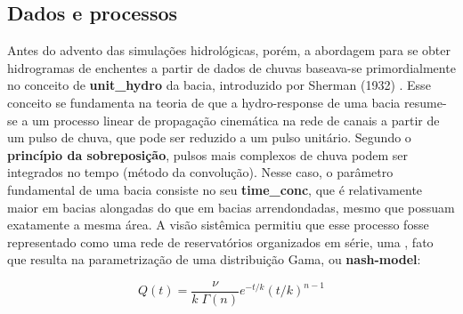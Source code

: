 \documentclass[./main.tex]{subfiles}
\begin{document}
\subsection{Dados e processos} \label{sec:hydro:databased}

\par Antes do advento das simulações hidrológicas, porém, a abordagem para se obter hidrogramas de enchentes a partir de dados de chuvas baseava-se primordialmente no conceito de \textbf{\gls{unit_hydro}} da bacia, introduzido por Sherman (1932) \cite{Sherman1932a}. Esse conceito se fundamenta na teoria de que a \gls{hydro-response} de uma bacia resume-se a um processo linear de propagação cinemática na rede de canais a partir de um pulso de chuva, que pode ser reduzido a um pulso unitário. Segundo o \textbf{princípio da sobreposição}, pulsos mais complexos de chuva podem ser integrados no tempo (método da convolução). Nesse caso, o parâmetro fundamental de uma bacia consiste no seu \textbf{\gls{time_conc}}, que é relativamente maior em bacias alongadas do que em bacias arrendondadas, mesmo que possuam exatamente a mesma área. A visão sistêmica permitiu que esse processo fosse representado como uma rede de reservatórios organizados em série, uma , fato que resulta na parametrização de uma distribuição Gama, ou \textbf{\gls{nash-model}}:
\begin{linenomath*}
\begin{equation}
\label{eq:kalinin}
Q(t) = \frac{\nu}{k\; \Gamma(n)} e^{-t/k} (t/k )^{n-1}
\end{equation}
\end{linenomath*}
\end{document}

